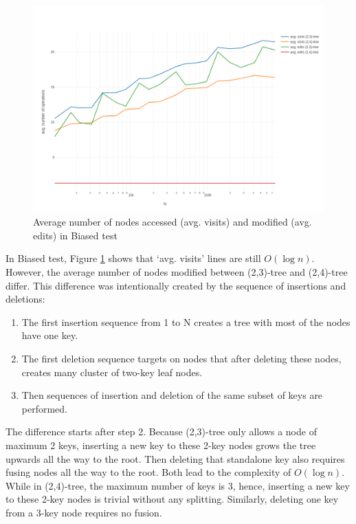 \documentclass{article}
\begin{document}
\begin{figure}[h!]
\centering
\includegraphics[width=\textwidth]{NTIN066-abtree-plot2.png}
\caption{Average number of nodes accessed (avg. visits) and modified (avg. edits) in Biased test}
\label{fig:bia}
\end{figure}

In Biased test, Figure \ref{fig:bia} shows that `avg. visits' lines are still $O(\log n)$. However, the average number of nodes modified between (2,3)-tree and (2,4)-tree differ. This difference was intentionally created by the sequence of insertions and deletions:
\begin{enumerate}
    \item The first insertion sequence from 1 to N creates a tree with most of the nodes have one key.
    \item The first deletion sequence targets on nodes that after deleting these nodes, creates many cluster of two-key leaf nodes.
    \item Then sequences of insertion and deletion of the same subset of keys are performed.
\end{enumerate}

The difference starts after step 2. Because (2,3)-tree only allows a node of maximum 2 keys, inserting a new key to these 2-key nodes grows the tree upwards all the way to the root. Then deleting that standalone key also requires fusing nodes all the way to the root. Both lead to the complexity of $O(\log n)$. While in (2,4)-tree, the maximum number of keys is 3, hence, inserting a new key to these 2-key nodes is trivial without any splitting. Similarly, deleting one key from a 3-key node requires no fusion.
\end{document}
